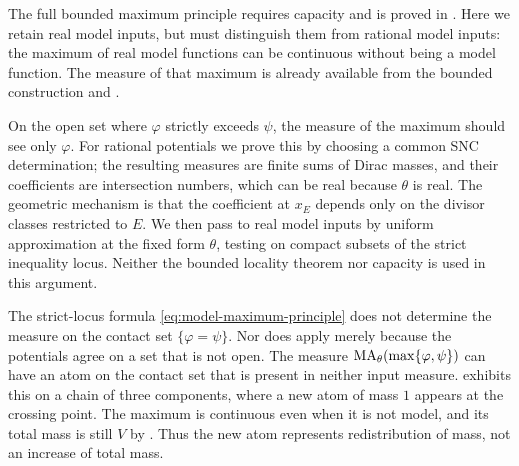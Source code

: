 The full bounded maximum principle requires capacity and is proved in
.  Here we retain real model inputs,
but must distinguish them from rational model inputs: the maximum of
real model functions can be continuous without being a model function.
The measure of that maximum is already available from the bounded
construction and .

On the open set where \(\varphi\) strictly exceeds \(\psi\), the measure
of the maximum should see only \(\varphi\).  For rational potentials we
prove this by choosing a common SNC determination; the resulting
measures are finite sums of Dirac masses, and their coefficients are
intersection numbers, which can be real because \(\theta\) is real.
The geometric mechanism is that the coefficient at \(x_E\) depends only
on the divisor classes restricted to \(E\).  We then pass to real model
inputs by uniform approximation at the fixed form \(\theta\), testing on
compact subsets of the strict inequality locus.  Neither the bounded
locality theorem nor capacity is used in this argument.


\begin{remark}
\label{rem:ch24-contact-mass}
The strict-locus formula \eqref{eq:model-maximum-principle} does not
determine the measure on the contact set \(\{\varphi=\psi\}\).
Nor does  apply merely because the
potentials agree on a set that is not open.  The measure
\(\operatorname{MA}_\theta(\max\{\varphi,\psi\})\) can have an atom on the contact set
that is present in neither input measure.
 exhibits this on a chain of three
components, where a new atom of mass \(1\) appears at the crossing point.
The maximum is continuous even when it is not model, and its total
mass is still \(V\) by .
Thus the new atom represents redistribution of mass, not an increase
of total mass.
\end{remark}
